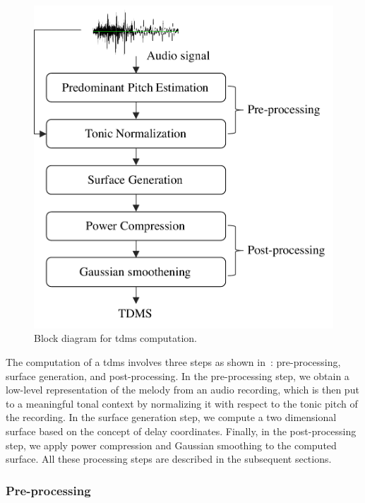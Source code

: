 \begin{figure}
	\begin{center}
		\includegraphics[width=\figSizeSixty]{ch07_ragaRecognition/figures/tdms_computation.pdf}
	\end{center}
	\caption{Block diagram for \acrshort{tdms} computation.}
	\label{fig:bd_tdms_computation}
\end{figure}

The computation of a \gls{tdms} involves three steps as shown in~: pre-processing, surface generation, and post-processing. In the pre-processing step, we obtain a low-level representation of the melody from an audio recording, which is then put to a meaningful tonal context by normalizing it with respect to the tonic pitch of the recording. In the surface generation step, we compute a two dimensional surface based on the concept of delay coordinates. Finally, in the post-processing step, we apply power compression and Gaussian smoothing to the computed surface. All these processing steps are described in the subsequent sections.

\subsubsection{Pre-processing} 
\label{sec:tdms_preprocessing}

